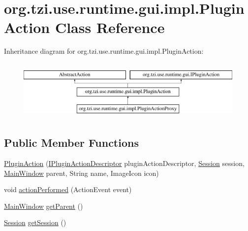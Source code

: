 \hypertarget{classorg_1_1tzi_1_1use_1_1runtime_1_1gui_1_1impl_1_1_plugin_action}{\section{org.\-tzi.\-use.\-runtime.\-gui.\-impl.\-Plugin\-Action Class Reference}
\label{classorg_1_1tzi_1_1use_1_1runtime_1_1gui_1_1impl_1_1_plugin_action}
}
Inheritance diagram for org.\-tzi.\-use.\-runtime.\-gui.\-impl.\-Plugin\-Action\-:\begin{figure}[H]
\begin{center}
\leavevmode
\includegraphics[height=3.000000cm]{classorg_1_1tzi_1_1use_1_1runtime_1_1gui_1_1impl_1_1_plugin_action}
\end{center}
\end{figure}
\subsection*{Public Member Functions}
\begin{DoxyCompactItemize}
\item 
\hyperlink{classorg_1_1tzi_1_1use_1_1runtime_1_1gui_1_1impl_1_1_plugin_action_a03545ed1de0e1d3564c093d725348cb0}{Plugin\-Action} (\hyperlink{interfaceorg_1_1tzi_1_1use_1_1runtime_1_1gui_1_1_i_plugin_action_descriptor}{I\-Plugin\-Action\-Descriptor} plugin\-Action\-Descriptor, \hyperlink{classorg_1_1tzi_1_1use_1_1main_1_1_session}{Session} session, \hyperlink{classorg_1_1tzi_1_1use_1_1gui_1_1main_1_1_main_window}{Main\-Window} parent, String name, Image\-Icon icon)
\item 
void \hyperlink{classorg_1_1tzi_1_1use_1_1runtime_1_1gui_1_1impl_1_1_plugin_action_a9b926401535f36331747c342a09daf9b}{action\-Performed} (Action\-Event event)
\item 
\hyperlink{classorg_1_1tzi_1_1use_1_1gui_1_1main_1_1_main_window}{Main\-Window} \hyperlink{classorg_1_1tzi_1_1use_1_1runtime_1_1gui_1_1impl_1_1_plugin_action_a93d2a571374f8edb4efebe96f61d7085}{get\-Parent} ()
\item 
\hyperlink{classorg_1_1tzi_1_1use_1_1main_1_1_session}{Session} \hyperlink{classorg_1_1tzi_1_1use_1_1runtime_1_1gui_1_1impl_1_1_plugin_action_a341571adc461fbf9e59fa395fa37a140}{get\-Session} ()
\end{DoxyCompactItemize}



